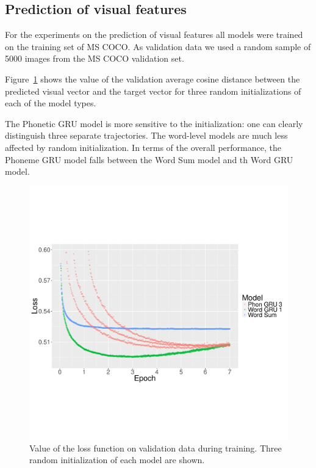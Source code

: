 \subsection{Prediction of visual features}
For the experiments on the prediction of visual features all models
were trained on the training set of MS COCO. As validation data we
used a random sample of 5000 images from the MS COCO validation set. 

Figure~\ref{fig:loss} shows the value of the validation average cosine distance
between the predicted visual vector and the target vector for three
random initializations of each of the model types. 

The Phonetic GRU model is more sensitive to the initialization: one
can clearly distinguish three separate trajectories. The word-level models
are much less affected by random initialization. In terms of the
overall performance, the {\sc Phoneme GRU} model falls between the
{\sc Word Sum} model and th {\sc Word GRU} model.

\begin{figure}
  \centering
  \includegraphics[scale=0.3]{loss-zoom.pdf}
  \caption{Value of the loss function on validation data during
    training. Three random initialization of each model are shown.}
  \label{fig:loss}
\end{figure}

